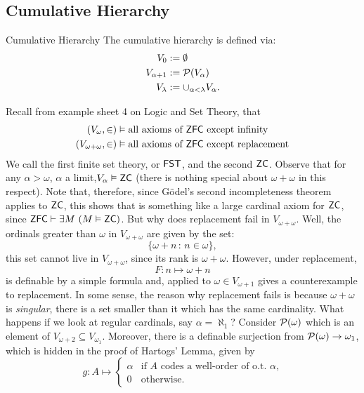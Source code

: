\documentclass{article}
\begin{document}
\subsection{Cumulative Hierarchy}
\begin{fancydefine}{Cumulative Hierarchy}
    The cumulative hierarchy is defined via: \begin{align*}
        V_{0} &:= \emptyset\\
        V_{\alpha+1} &:= \mathcal{P}(V_{\alpha})\\
        V_{\lambda} &:= \cup_{\alpha < \lambda} V_{\alpha}.
    \end{align*}
\end{fancydefine}
Recall from example sheet 4 on Logic and Set Theory, that \begin{align*}
    (V_{\omega}, \in) &\vDash \text{all axioms of $\mathsf{ZFC}$ except infinity}\\
    (V_{\omega + \omega}, \in) &\vDash \text{all axioms of $\mathsf{ZFC}$ except replacement}
\end{align*}
We call the first finite set theory, or $\mathsf{FST}$, and the second $\mathsf{ZC}$. Observe that for any $\alpha > \omega$, $\alpha$ a limit,$ V_{\alpha} \vDash \mathsf{ZC}$ (there is nothing special about $\omega + \omega$ in this respect). Note that, therefore, since G\"odel's second incompleteness theorem applies to $\mathsf{ZC}$, this shows that  is something like a large cardinal axiom for $\mathsf{ZC}$, since $\mathsf{ZFC} \vdash \exists M \,\, (M \vDash \mathsf{ZC})$.\gap 
But why does replacement fail in $V_{\omega+\omega}$. Well, the ordinals greater than $\omega$ in $V_{\omega + \omega}$ are given by the set: \[ \{\omega + n \,: \, n \in \omega\},\] this set cannot live in $V_{\omega + \omega}$, since its rank is $\omega+\omega$. However, under replacement, \[ F: n \mapsto \omega + n\] is definable by a simple formula and, applied to $\omega \in V_{\omega+1}$ gives a counterexample to replacement. \gap 
In some sense, the reason why replacement fails is because $\omega + \omega$ is \textit{singular}, there is a set smaller than it which has the same cardinality. What happens if we look at regular cardinals, say $\alpha = \aleph_{1}$?\gap
Consider $\mathcal{P}(\omega)$ which is an element of $V_{\omega+2} \subseteq V_{\omega_{1}}$. Moreover, there is a definable surjection from $\mathcal{P}(\omega) \to \omega_{1}$, which is hidden in the proof of Hartogs' Lemma, given by \[ g: A \mapsto \begin{cases}
    \alpha & \text{if $A$ codes a well-order of o.t. $\alpha$,}\\
    0 & \text{otherwise.}
\end{cases}
\]
\end{document}
